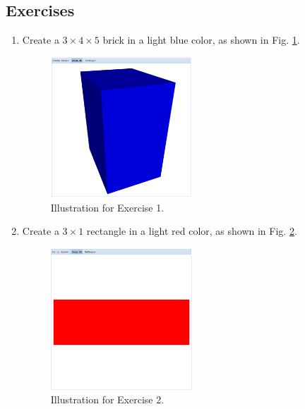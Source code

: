 \documentclass{article}
\begin{document}
\subsection{Exercises}

\begin{enumerate}
\item
Create a $3 \times 4 \times 5$ brick in a light
blue color, as shown in Fig. \ref{fig:a1}.

\newpage

\begin{figure}[!ht]
\begin{center}
\includegraphics[width=0.5\textwidth]{img/a1-blue-brick.png}
\end{center}
\vspace{-2mm}
\caption{Illustration for Exercise 1.}
\label{fig:a1}
\end{figure}

\item Create a $3 \times 1$ rectangle in a light
red color, as shown in Fig. \ref{fig:a2}.

\begin{figure}[!ht]
\begin{center}
\includegraphics[width=0.5\textwidth]{img/a2-red-rectangle.png}
\end{center}
\vspace{-2mm}
\caption{Illustration for Exercise 2.}
\label{fig:a2}
\vspace{-0cm}
\end{figure}


\end{enumerate}
\end{document}
